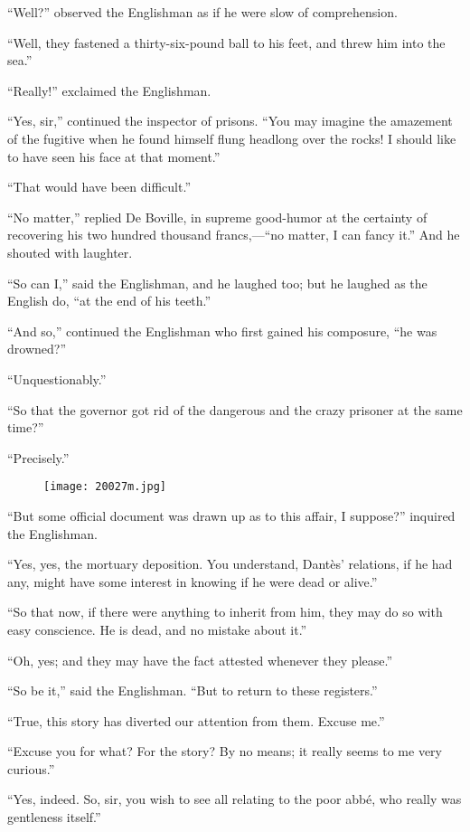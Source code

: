 “Well?” observed the Englishman as if he were slow of comprehension.

“Well, they fastened a thirty-six-pound ball to his feet, and threw him
into the sea.”

“Really!” exclaimed the Englishman.

“Yes, sir,” continued the inspector of prisons. “You may imagine the
amazement of the fugitive when he found himself flung headlong over the
rocks! I should like to have seen his face at that moment.”

“That would have been difficult.”

“No matter,” replied De Boville, in supreme good-humor at the certainty
of recovering his two hundred thousand francs,—“no matter, I can fancy
it.” And he shouted with laughter.

“So can I,” said the Englishman, and he laughed too; but he laughed as
the English do, “at the end of his teeth.”

“And so,” continued the Englishman who first gained his composure, “he
was drowned?”

“Unquestionably.”

“So that the governor got rid of the dangerous and the crazy prisoner
at the same time?”

“Precisely.”

\begin{figure}[ht]
\texttt{[image: 20027m.jpg]}
\end{figure}

“But some official document was drawn up as to this affair, I suppose?”
inquired the Englishman.

“Yes, yes, the mortuary deposition. You understand, Dantès’ relations,
if he had any, might have some interest in knowing if he were dead or
alive.”

“So that now, if there were anything to inherit from him, they may do
so with easy conscience. He is dead, and no mistake about it.”

“Oh, yes; and they may have the fact attested whenever they please.”

“So be it,” said the Englishman. “But to return to these registers.”

“True, this story has diverted our attention from them. Excuse me.”

“Excuse you for what? For the story? By no means; it really seems to me
very curious.”

“Yes, indeed. So, sir, you wish to see all relating to the poor abbé,
who really was gentleness itself.”

